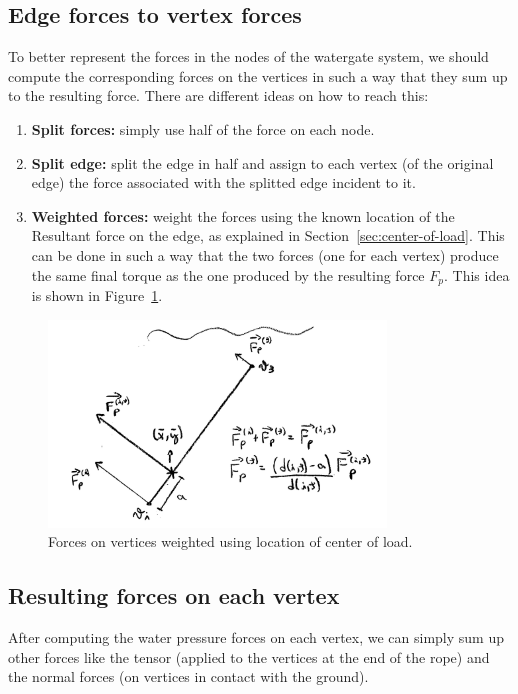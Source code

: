 \documentclass[12pt]{article}
\begin{document}
\subsection{Edge forces to vertex forces}

To better represent the forces in the nodes of the watergate system, we should compute the corresponding forces on the vertices in such a way that they sum up to the resulting force. There are different ideas on how to reach this:

\begin{enumerate}
  \item \textbf{Split forces:} simply use half of the force on each node.
  \item \textbf{Split edge:} split the edge in half and assign to each vertex (of the original edge) the force associated with the splitted edge incident to it.
  \item \textbf{Weighted forces:} weight the forces using the known location of the Resultant force on the edge, as explained in Section~\ref{sec:center-of-load}. This can be done in such a way that the two forces (one for each vertex) produce the same final torque as the one produced by the resulting force $F_p$. This idea is shown in Figure~\ref{fig:vertex-forces}.
\end{enumerate}

\begin{figure}[hbt]
  \begin{center}
    \includegraphics[width=0.8\textwidth]{vertex-forces.png}
  \end{center}
  \caption{Forces on vertices weighted using location of center of load.}
  \label{fig:vertex-forces}
\end{figure}

\subsection{Resulting forces on each vertex}

After computing the water pressure forces on each vertex, we can simply sum up other forces like the tensor (applied to the vertices at the end of the rope) and the normal forces (on vertices in contact with the ground).
\end{document}
